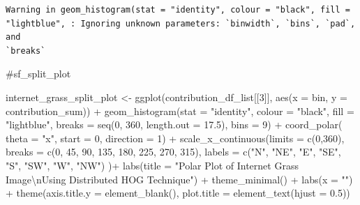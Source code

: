 \documentclass[
  letterpaper,
  DIV=11,
  numbers=noendperiod]{scrreprt}
\newenvironment{Shaded}{\begin{snugshade}}{\end{snugshade}}
\newcommand{\AttributeTok}[1]{\textcolor[rgb]{0.40,0.45,0.13}{#1}}
\newcommand{\CommentTok}[1]{\textcolor[rgb]{0.37,0.37,0.37}{#1}}
\newcommand{\DecValTok}[1]{\textcolor[rgb]{0.68,0.00,0.00}{#1}}
\newcommand{\FloatTok}[1]{\textcolor[rgb]{0.68,0.00,0.00}{#1}}
\newcommand{\FunctionTok}[1]{\textcolor[rgb]{0.28,0.35,0.67}{#1}}
\newcommand{\NormalTok}[1]{\textcolor[rgb]{0.00,0.23,0.31}{#1}}
\newcommand{\OtherTok}[1]{\textcolor[rgb]{0.00,0.23,0.31}{#1}}
\newcommand{\SpecialCharTok}[1]{\textcolor[rgb]{0.37,0.37,0.37}{#1}}
\newcommand{\StringTok}[1]{\textcolor[rgb]{0.13,0.47,0.30}{#1}}
\begin{document}
\begin{verbatim}
Warning in geom_histogram(stat = "identity", colour = "black", fill =
"lightblue", : Ignoring unknown parameters: `binwidth`, `bins`, `pad`, and
`breaks`
\end{verbatim}

\begin{Shaded}
\begin{Highlighting}[]
\CommentTok{\#sf\_split\_plot}
\end{Highlighting}
\end{Shaded}

\begin{Shaded}
\begin{Highlighting}[]
\NormalTok{internet\_grass\_split\_plot }\OtherTok{\textless{}{-}}
  \FunctionTok{ggplot}\NormalTok{(contribution\_df\_list[[}\DecValTok{3}\NormalTok{]], }
         \FunctionTok{aes}\NormalTok{(}\AttributeTok{x =}\NormalTok{ bin, }\AttributeTok{y =}\NormalTok{ contribution\_sum)) }\SpecialCharTok{+}
  \FunctionTok{geom\_histogram}\NormalTok{(}\AttributeTok{stat =} \StringTok{"identity"}\NormalTok{,}
                 \AttributeTok{colour =} \StringTok{"black"}\NormalTok{, }
                 \AttributeTok{fill =} \StringTok{"lightblue"}\NormalTok{, }
                 \AttributeTok{breaks =} \FunctionTok{seq}\NormalTok{(}\DecValTok{0}\NormalTok{, }\DecValTok{360}\NormalTok{, }\AttributeTok{length.out =} \FloatTok{17.5}\NormalTok{),}
                 \AttributeTok{bins =} \DecValTok{9}\NormalTok{) }\SpecialCharTok{+}
  \FunctionTok{coord\_polar}\NormalTok{(}
    \AttributeTok{theta =} \StringTok{"x"}\NormalTok{, }\AttributeTok{start =} \DecValTok{0}\NormalTok{, }\AttributeTok{direction =} \DecValTok{1}\NormalTok{) }\SpecialCharTok{+}
  \FunctionTok{scale\_x\_continuous}\NormalTok{(}\AttributeTok{limits =} \FunctionTok{c}\NormalTok{(}\DecValTok{0}\NormalTok{,}\DecValTok{360}\NormalTok{),}
    \AttributeTok{breaks =} \FunctionTok{c}\NormalTok{(}\DecValTok{0}\NormalTok{, }\DecValTok{45}\NormalTok{, }\DecValTok{90}\NormalTok{, }\DecValTok{135}\NormalTok{, }\DecValTok{180}\NormalTok{, }\DecValTok{225}\NormalTok{, }\DecValTok{270}\NormalTok{, }\DecValTok{315}\NormalTok{), }
    \AttributeTok{labels =} \FunctionTok{c}\NormalTok{(}\StringTok{"N"}\NormalTok{, }\StringTok{"NE"}\NormalTok{, }\StringTok{"E"}\NormalTok{, }\StringTok{"SE"}\NormalTok{, }\StringTok{"S"}\NormalTok{, }\StringTok{"SW"}\NormalTok{, }\StringTok{"W"}\NormalTok{, }\StringTok{"NW"}\NormalTok{)}
\NormalTok{  )}\SpecialCharTok{+}
  \FunctionTok{labs}\NormalTok{(}\AttributeTok{title =} \StringTok{"Polar Plot of Internet Grass Image}\SpecialCharTok{\textbackslash{}n}\StringTok{Using Distributed HOG Technique"}\NormalTok{) }\SpecialCharTok{+}
  \FunctionTok{theme\_minimal}\NormalTok{() }\SpecialCharTok{+}
  \FunctionTok{labs}\NormalTok{(}\AttributeTok{x =} \StringTok{""}\NormalTok{) }\SpecialCharTok{+}
  \FunctionTok{theme}\NormalTok{(}\AttributeTok{axis.title.y =} \FunctionTok{element\_blank}\NormalTok{(),}
        \AttributeTok{plot.title =} \FunctionTok{element\_text}\NormalTok{(}\AttributeTok{hjust =} \FloatTok{0.5}\NormalTok{))}
\end{Highlighting}
\end{Shaded}
\end{document}

